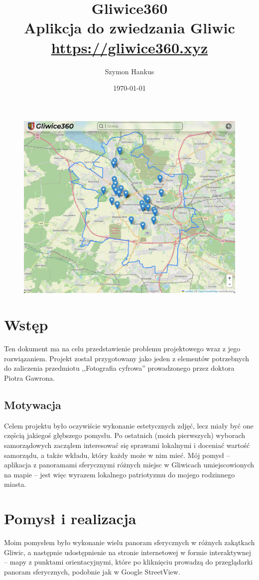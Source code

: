 \documentclass[a4paper]{mwart}
\title{Gliwice360 \\ Aplikcja do zwiedzania Gliwic \\ \url{https://gliwice360.xyz}}
\author{Szymon Hankus}
\date{\today}
\begin{document}
\maketitle
\begin{figure}[H]
\centering
\includegraphics[width=\textwidth]{images/main.jpg}
\end{figure}
\tableofcontents
\newpage

\section{Wstęp}
Ten dokument ma na celu przedstawienie problemu projektowego wraz z jego
rozwiązaniem. Projekt został przygotowany jako jeden z elementów potrzebnych do
zaliczenia przedmiotu ,,Fotografia cyfrowa'' prowadzonego przez doktora Piotra
Gawrona.

\subsection{Motywacja}
Celem projektu było oczywiście wykonanie estetycznych zdjęć, lecz miały być one
częścią jakiegoś głębszego pomysłu. Po ostatnich (moich pierwszych) wyborach
samorządowych zacząłem interesować się sprawami lokalnymi i doceniać wartość 
samorządu, a także wkładu, który każdy może w nim mieć. Mój pomysł -- aplikacja
z panoramami sferycznymi różnych miejsc w Gliwicach umiejscowionych na mapie --
jest więc wyrazem lokalnego patriotyzmu do mojego rodzinnego miasta.

\section{Pomysł i realizacja}
Moim pomysłem było wykonanie wielu panoram sferycznych w różnych zakątkach
Gliwic, a następnie udostępnienie na stronie internetowej w formie interaktywnej
-- mapy z punktami orientacyjnymi, które po kliknięciu prowadzą do przeglądarki
panoram sferycznych, podobnie jak w Google StreetView.
\end{document}
